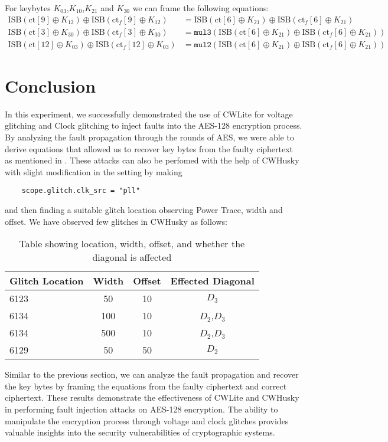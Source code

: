 For keybytes $K_{03}$,$K_{10}$,$K_{21}$ and $K_{30}$ we can frame the following equations:
\begin{align*}
    \text{ISB}(\text{ct}[9] \oplus K_{12}) \oplus \text{ISB}(\text{ct}_f[9] \oplus K_{12}) &= \text{ISB}(\text{ct}[6] \oplus K_{21}) \oplus \text{ISB}(\text{ct}_f[6] \oplus K_{21}) \\
    \text{ISB}(\text{ct}[3] \oplus K_{30}) \oplus \text{ISB}(\text{ct}_f[3] \oplus K_{30}) &= \texttt{mul3}\left( \text{ISB}(\text{ct}[6] \oplus K_{21}) \oplus \text{ISB}(\text{ct}_f[6] \oplus K_{21}) \right) \\
    \text{ISB}(\text{ct}[12] \oplus K_{03}) \oplus \text{ISB}(\text{ct}_f[12] \oplus K_{03}) &= \texttt{mul2}\left( \text{ISB}(\text{ct}[6] \oplus K_{21}) \oplus \text{ISB}(\text{ct}_f[6] \oplus K_{21}) \right)
    \end{align*}

\section{Conclusion}
In this experiment, we successfully demonstrated the use of CWLite for voltage glitching and Clock glitching to inject faults into the AES-128 encryption process. By analyzing the fault propagation through the rounds of AES, we were able to derive equations that allowed us to recover key bytes from the faulty ciphertext as mentioned in \cite{Saha2009ADF}. These attacks can also be perfomed with the help of CWHusky with slight modification in the setting by making 
\begin{verbatim}
    scope.glitch.clk_src = "pll"
\end{verbatim} 
and then finding a suitable glitch location observing Power Trace, width and offset.
We have observed few glitches in CWHusky as follows:
\begin{table}[h!]
    \centering
    \begin{tabular}{|l|c|c|c|}
    \hline
    \textbf{Glitch Location} & \textbf{Width} & \textbf{Offset} & \textbf{Effected Diagonal} \\
    \hline
    6123 & 50 & 10 & $D_3$ \\
    6134 & 100 & 10 & $D_2$,$D_3$ \\
    6134 & 500 & 10 & $D_2$,$D_3$ \\
    6129 & 50 & 50 & $D_2$ \\
    \hline
    \end{tabular}
    \caption{Table showing location, width, offset, and whether the diagonal is affected}
    \label{tab:location_data}
    \end{table}
Similar to the previous section, we can analyze the fault propagation and recover the key bytes by framing the equations from the faulty ciphertext and correct ciphertext.
These results demonstrate the effectiveness of CWLite and CWHusky in performing fault injection attacks on AES-128 encryption. The ability to manipulate the encryption process through voltage and clock glitches provides valuable insights into the security vulnerabilities of cryptographic systems.
 


